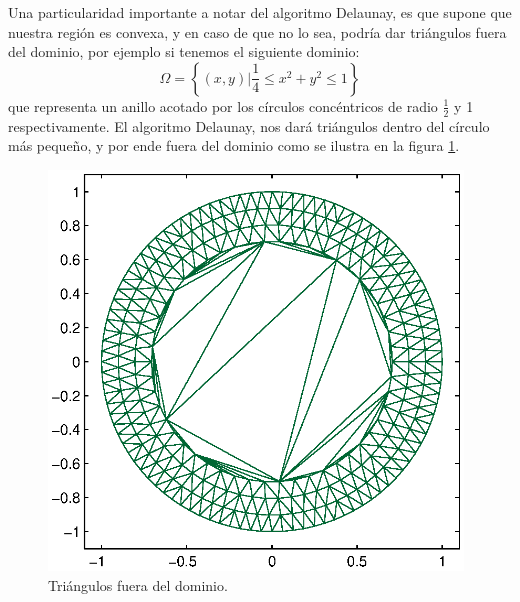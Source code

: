 \documentclass[12pt,spanish,oneside]{book}
\theoremstyle{plain}
\numberwithin{equation}{chapter}
\theoremstyle{definition}
\theoremstyle{remark}
\newcommand{\llaves}[1]{\left\lbrace #1\right\rbrace}
\begin{document}
Una particularidad importante a notar del algoritmo Delaunay, es que supone que nuestra región es convexa, y en caso de que no lo sea, podría dar triángulos fuera del dominio, por ejemplo si tenemos el siguiente dominio: \[\Omega=\llaves{ (x,y)|\frac{1}{4}\leq x^2+y^2\leq 1 }\] que representa un anillo acotado por los círculos concéntricos de radio $\frac{1}{2}$ y 1 respectivamente. El algoritmo Delaunay, nos dará triángulos dentro del círculo más pequeño, y por ende fuera del dominio como se ilustra en la figura \ref{trimal}.

\begin{figure}[H]\label{triangmal}
\centering
\includegraphics[width=11cm]{img/trimal.eps}
\caption{Triángulos fuera del dominio.}
\label{trimal}
\end{figure}
\end{document}

